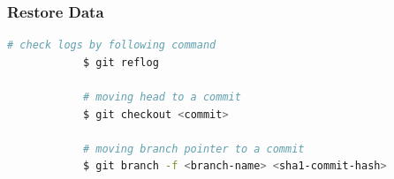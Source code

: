 \documentclass{beamer}
\begin{document}
	\begin{frame}[fragile]
		\frametitle{Restore Data}
		
		\begin{lstlisting}[language=bash]
			# check logs by following command
			$ git reflog
			
			# moving head to a commit
			$ git checkout <commit>
			
			# moving branch pointer to a commit
			$ git branch -f <branch-name> <sha1-commit-hash>
		\end{lstlisting}
	\end{frame}
\end{document}
